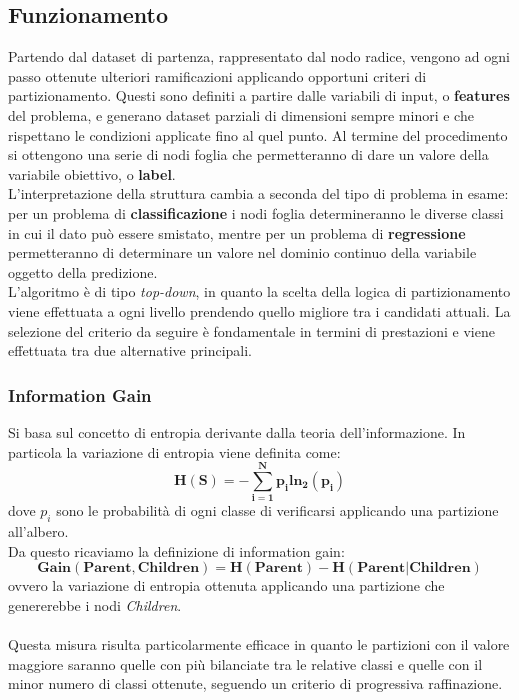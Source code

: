 \subsection{Funzionamento}
Partendo dal dataset di partenza, rappresentato dal nodo radice, vengono ad ogni passo ottenute ulteriori ramificazioni applicando opportuni criteri di partizionamento. Questi sono definiti a partire dalle variabili di input, o \textbf{features} del problema, e generano dataset parziali di dimensioni sempre minori e che rispettano le condizioni applicate fino al quel punto. Al termine del procedimento si ottengono una serie di nodi foglia che permetteranno di dare un valore della variabile obiettivo, o \textbf{label}. \\
L'interpretazione della struttura cambia a seconda del tipo di problema in esame: per un problema di \textbf{classificazione} i nodi foglia determineranno le diverse classi in cui il dato può essere smistato, mentre per un problema di \textbf{regressione} permetteranno di determinare un valore nel dominio continuo della variabile oggetto della predizione.\\
L'algoritmo è di tipo \textit{top-down}, in quanto la scelta della logica di partizionamento viene effettuata a ogni livello prendendo quello migliore tra i candidati attuali. La selezione del criterio da seguire è fondamentale in termini di prestazioni e viene effettuata tra due alternative principali.

\subsubsection{Information Gain}
Si basa sul concetto di entropia derivante dalla teoria dell'informazione. In particola la variazione di entropia viene definita come:
\[ \mathbf{H(S) = -\sum_{i=1}^Np_{i}ln_{2}(p_{i}) } \]
dove $p_{i}$ sono le probabilità di ogni classe di verificarsi applicando una partizione all'albero.\\
Da questo ricaviamo la definizione di information gain:
\[ \mathbf{Gain(Parent,Children) = H(Parent)-H(Parent|Children) } \]
ovvero la variazione di entropia ottenuta applicando una partizione che genererebbe i nodi \textit{Children}.\\\\
Questa misura risulta particolarmente efficace in quanto le partizioni con il valore maggiore saranno quelle con più bilanciate tra le relative classi e quelle con il minor numero di classi ottenute, seguendo un criterio di progressiva raffinazione.

